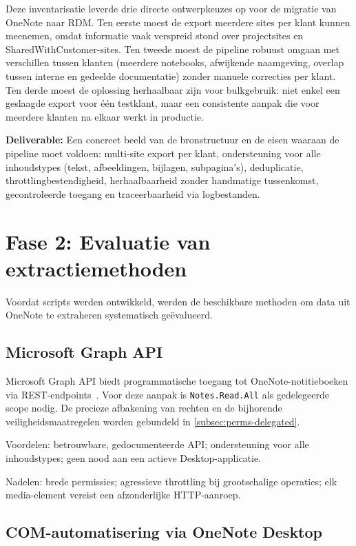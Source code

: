 Deze inventarisatie leverde drie directe ontwerpkeuzes op voor de migratie van OneNote naar RDM. Ten eerste moest de export meerdere sites per klant kunnen meenemen, omdat informatie vaak verspreid stond over projectsites en SharedWithCustomer-sites. Ten tweede moest de pipeline robuust omgaan met verschillen tussen klanten (meerdere notebooks, afwijkende naamgeving, overlap tussen interne en gedeelde documentatie) zonder manuele correcties per klant. Ten derde moest de oplossing herhaalbaar zijn voor bulkgebruik: niet enkel een geslaagde export voor één testklant, maar een consistente aanpak die voor meerdere klanten na elkaar werkt in productie.

\textbf{Deliverable:} Een concreet beeld van de bronstructuur en de eisen waaraan de pipeline moet voldoen: multi-site export per klant, ondersteuning voor alle inhoudstypes (tekst, afbeeldingen, bijlagen, subpagina's), deduplicatie, throttlingbestendigheid, herhaalbaarheid zonder handmatige tussenkomst, gecontroleerde toegang en traceerbaarheid via logbestanden.

\section{Fase 2: Evaluatie van extractiemethoden}
\label{sec:fase2-extractiemethoden}

Voordat scripts werden ontwikkeld, werden de beschikbare methoden om data uit OneNote te extraheren systematisch geëvalueerd.

\subsection{Microsoft Graph API}
\label{subsec:methode-graph}

Microsoft Graph API biedt programmatische toegang tot OneNote-notitieboeken via REST-endpoints~\autocite{msgraph2025notes}. Voor deze aanpak is \texttt{Notes.Read.All} als gedelegeerde scope nodig. De precieze afbakening van rechten en de bijhorende veiligheidsmaatregelen worden gebundeld in \autoref{subsec:perms-delegated}.

Voordelen: betrouwbare, gedocumenteerde API; ondersteuning voor alle inhoudstypes; geen nood aan een actieve Desktop-applicatie.

Nadelen: brede permissies; agressieve throttling bij grootschalige operaties; elk media-element vereist een afzonderlijke HTTP-aanroep.

\subsection{COM-automatisering via OneNote Desktop}
\label{subsec:methode-com}

